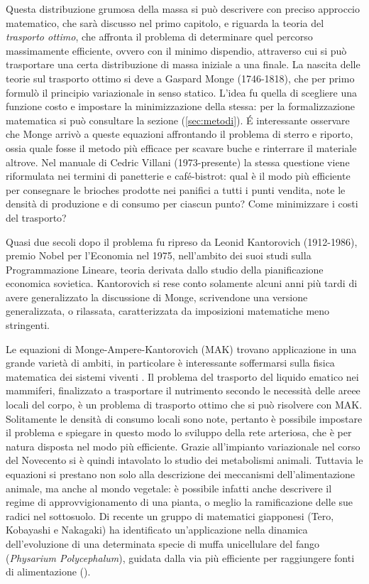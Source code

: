 Questa distribuzione grumosa della massa si può descrivere con preciso approccio matematico, che sarà discusso nel primo capitolo,
e riguarda la teoria del \textit{trasporto ottimo}, che affronta il problema di determinare quel percorso massimamente
efficiente, ovvero con il minimo dispendio, attraverso cui si può trasportare una certa distribuzione di massa iniziale a una 
finale. La nascita delle teorie sul trasporto ottimo si deve a Gaspard Monge (1746-1818), che per primo formulò il principio
variazionale in senso statico. L'idea fu quella di scegliere una funzione costo e impostare la minimizzazione della stessa: 
per la formalizzazione matematica si può consultare la sezione (\ref{sec:metodi}). \'E interessante osservare che Monge 
arrivò a queste equazioni affrontando il problema di sterro e riporto, ossia quale fosse il metodo più efficace per scavare buche
e rinterrare il materiale altrove. Nel manuale di Cedric Villani (1973-presente) la stessa questione viene riformulata nei termini
di panetterie e café-bistrot: qual è il modo più efficiente per consegnare le brioches prodotte nei panifici a tutti i punti vendita,
note le densità di produzione e di consumo per ciascun punto? Come minimizzare i costi del trasporto?

Quasi due secoli dopo il problema fu ripreso da Leonid Kantorovich (1912-1986), premio Nobel per l'Economia nel 1975, nell'ambito 
dei suoi studi sulla Programmazione Lineare, teoria derivata dallo studio della pianificazione economica sovietica. Kantorovich si
rese conto solamente alcuni anni più tardi di avere generalizzato la discussione di Monge, scrivendone una versione generalizzata,
o rilassata, caratterizzata da imposizioni matematiche meno stringenti.

Le equazioni di Monge-Ampere-Kantorovich (MAK) trovano applicazione in una grande varietà di ambiti, in particolare è interessante 
soffermarsi sulla fisica matematica dei sistemi viventi \cite{cardin}. Il problema del trasporto del liquido ematico nei mammiferi,
finalizzato a trasportare il nutrimento secondo le necessità delle areee locali del corpo, è un problema di trasporto
ottimo che si può risolvere con MAK. Solitamente le densità di consumo locali sono note, pertanto è possibile impostare
il problema e spiegare in questo modo lo sviluppo della rete arteriosa, che è per natura disposta nel modo più efficiente.
Grazie all'impianto variazionale nel corso del Novecento si è quindi intavolato lo studio dei metabolismi animali.
Tuttavia le equazioni si prestano non solo alla descrizione dei meccanismi dell'alimentazione animale, ma anche al
mondo vegetale: è possibile infatti anche descrivere il regime di approvvigionamento di una pianta, o meglio 
la ramificazione delle sue radici nel sottosuolo.
Di recente un gruppo di matematici giapponesi (Tero, Kobayashi e Nakagaki) ha identificato un'applicazione nella
dinamica dell'evoluzione di una determinata specie di muffa unicellulare del fango (\textit{Physarium Polycephalum}),
guidata dalla via più efficiente per raggiungere fonti di alimentazione (\cite{yamada}).

